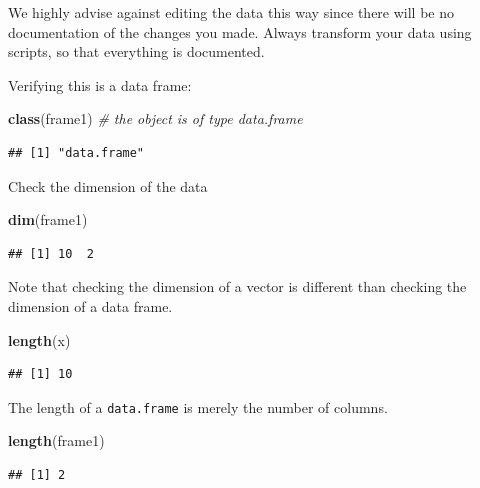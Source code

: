 \documentclass[]{book}
\newenvironment{Shaded}{\begin{snugshade}}{\end{snugshade}}
\newcommand{\CommentTok}[1]{\textcolor[rgb]{0.56,0.35,0.01}{\textit{#1}}}
\newcommand{\KeywordTok}[1]{\textcolor[rgb]{0.13,0.29,0.53}{\textbf{#1}}}
\newcommand{\NormalTok}[1]{#1}
\theoremstyle{definition}
\theoremstyle{definition}
\theoremstyle{definition}
\theoremstyle{remark}
\begin{document}
We highly advise against editing the data this way since there will be no documentation of the changes you made.
Always transform your data using scripts, so that everything is documented.

Verifying this is a data frame:

\begin{Shaded}
\begin{Highlighting}[]
\KeywordTok{class}\NormalTok{(frame1) }\CommentTok{# the object is of type data.frame}
\end{Highlighting}
\end{Shaded}

\begin{verbatim}
## [1] "data.frame"
\end{verbatim}

Check the dimension of the data

\begin{Shaded}
\begin{Highlighting}[]
\KeywordTok{dim}\NormalTok{(frame1)                             }
\end{Highlighting}
\end{Shaded}

\begin{verbatim}
## [1] 10  2
\end{verbatim}

Note that checking the dimension of a vector is different than checking the dimension of a data frame.

\begin{Shaded}
\begin{Highlighting}[]
\KeywordTok{length}\NormalTok{(x)}
\end{Highlighting}
\end{Shaded}

\begin{verbatim}
## [1] 10
\end{verbatim}

The length of a \texttt{data.frame} is merely the number of columns.

\begin{Shaded}
\begin{Highlighting}[]
\KeywordTok{length}\NormalTok{(frame1) }
\end{Highlighting}
\end{Shaded}

\begin{verbatim}
## [1] 2
\end{verbatim}
\end{document}
